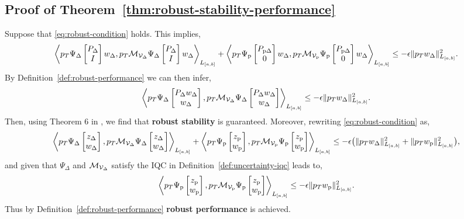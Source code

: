 \subsection{Proof of Theorem~\ref{thm:robust-stability-performance}}\label{proof:robust-stability-performance}
Suppose that \eqref{eq:robust-condition} holds. This implies,
\begin{equation*}
\left\langle p_T \Psi_\Delta\begin{bmatrix}P_\Delta \\ I\end{bmatrix}w_\Delta, p_T\mathcal{M}_{\mathcal{V}_\Delta}\Psi_\Delta\begin{bmatrix}P_\Delta \\ I\end{bmatrix}w_\Delta \right\rangle_{L_{[a,b]}}
+\left\langle p_T \Psi_{{\mathrm{p}}}\begin{bmatrix}P_{{\mathrm{p}}\Delta} \\ 0\end{bmatrix}w_\Delta, p_T\mathcal{M}_{\mathcal{V}_{{\mathrm{p}}}}\Psi_{{\mathrm{p}}}\begin{bmatrix}P_{{\mathrm{p}}\Delta} \\ 0\end{bmatrix}w_\Delta \right\rangle_{L_{[a,b]}}
\leq -\epsilon \|p_Tw_\Delta\|^2_{L_{[a,b]}}.
\end{equation*}
By Definition~\ref{def:robust-performance} we can then infer,
\begin{equation*}
\left\langle p_T \Psi_\Delta\begin{bmatrix}P_\Delta w_\Delta \\ w_\Delta\end{bmatrix}, p_T\mathcal{M}_{\mathcal{V}_\Delta}\Psi_\Delta\begin{bmatrix}P_\Delta w_\Delta \\ w_\Delta\end{bmatrix} \right\rangle_{L_{[a,b]}}
\leq -\epsilon \|p_Tw_\Delta\|^2_{L_{[a,b]}}.
\end{equation*}
Then, using Theorem 6 in \cite{10156335}, we find that \textbf{robust stability}
is guaranteed.
Moreover, rewriting \eqref{eq:robust-condition} as,
\begin{equation*}
\left\langle p_T\Psi_\Delta\begin{bmatrix}z_\Delta \\ w_\Delta\end{bmatrix}, p_T\mathcal{M}_{\mathcal{V}_\Delta}\Psi_\Delta\begin{bmatrix}z_\Delta \\ w_\Delta\end{bmatrix} \right\rangle_{L_{[a,b]}}
+\left\langle p_T\Psi_{{\mathrm{p}}}\begin{bmatrix}z_{{\mathrm{p}}} \\ w_{{\mathrm{p}}}\end{bmatrix}, p_T\mathcal{M}_{\mathcal{V}_{{\mathrm{p}}}}\Psi_{{\mathrm{p}}}\begin{bmatrix}z_{{\mathrm{p}}} \\ w_{{\mathrm{p}}}\end{bmatrix} \right\rangle_{L_{[a,b]}}
\leq -\epsilon\bigl(\|p_T{w_\Delta}\|^2_{L_{[a,b]}}
+\|p_T w_{{\mathrm{p}}}\|^2_{L_{[a,b]}}\bigr),
\end{equation*}
and given that $\Psi_\Delta$ and $\mathcal{M}_{\mathcal{V}_\Delta}$ satisfy the IQC in
Definition~\ref{def:uncertainty-iqc} leads to,
\begin{equation*}
\left\langle p_T\Psi_{{\mathrm{p}}}\begin{bmatrix}z_{{\mathrm{p}}} \\ w_{{\mathrm{p}}}\end{bmatrix}, p_T\mathcal{M}_{\mathcal{V}_{{\mathrm{p}}}}\Psi_{{\mathrm{p}}}\begin{bmatrix}z_{{\mathrm{p}}} \\ w_{{\mathrm{p}}}\end{bmatrix} \right\rangle_{L_{[a,b]}}
\leq -\epsilon \|p_T w_{{\mathrm{p}}}\|^2_{L_{[a,b]}}.
\end{equation*}
Thus by Definition~\ref{def:robust-performance} \textbf{robust performance} is achieved.
